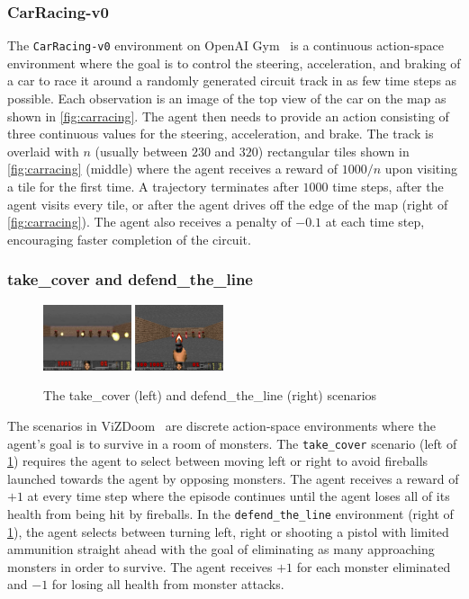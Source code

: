 \subsubsection{CarRacing-v0}

The \texttt{CarRacing-v0} environment on OpenAI Gym~\cite{brockman2016openai} is a continuous action-space environment where the goal is to control the steering, acceleration, and braking of a car to race it around a randomly generated circuit track in as few time steps as possible. Each observation is an image of the top view of the car on the map as shown in \cref{fig:carracing}. The agent then needs to provide an action consisting of three continuous values for the steering, acceleration, and brake. The track is overlaid with $n$ (usually between $230$ and $320$) rectangular tiles shown in \cref{fig:carracing} (middle) where the agent receives a reward of $1000/n$ upon visiting a tile for the first time. A trajectory terminates after $1000$ time steps, after the agent visits every tile, or after the agent drives off the edge of the map (right of \cref{fig:carracing}). The agent also receives a penalty of $-0.1$ at each time step, encouraging faster completion of the circuit.

\subsubsection{take\_cover and defend\_the\_line}

\begin{figure}[h!]
	\centering
	\includegraphics[width=0.23\textwidth]{images/doom2.jpeg}
	\includegraphics[width=0.23\textwidth]{images/doom1.png}
	\caption{The take_cover (left) and defend_the_line (right) scenarios}\label{fig:doom}
\end{figure}

The scenarios in ViZDoom~\cite{kempka2016vizdoom} are discrete action-space environments where the agent's goal is to survive in a room of monsters. The \texttt{take\_cover} scenario (left of \cref{fig:doom}) requires the agent to select between moving left or right to avoid fireballs launched towards the agent by opposing monsters. The agent receives a reward of $+1$ at every time step where the episode continues until the agent loses all of its health from being hit by fireballs. In the \texttt{defend\_the\_line} environment (right of \cref{fig:doom}), the agent selects between turning left, right or shooting a pistol with limited ammunition straight ahead with the goal of eliminating as many approaching monsters in order to survive. The agent receives $+1$ for each monster eliminated and $-1$ for losing all health from monster attacks.

